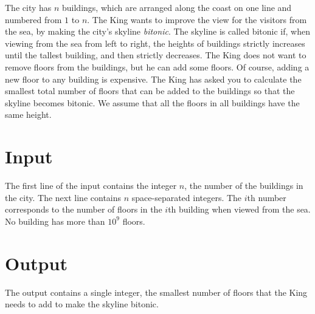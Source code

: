
The city has $n$ buildings, which are arranged along the coast on one line and numbered from $1$ to $n$.
The King wants to improve the view for the visitors from the sea, by making the city’s skyline \emph{bitonic}.
The skyline is called bitonic if, when viewing from the sea from left to right, the heights of buildings strictly increases until the tallest building, and then strictly decreases.
The King does not want to remove floors from the buildings, but he can add some floors.
Of course, adding a new floor to any building is expensive.
The King has asked you to calculate the smallest total number of floors that can be added to the buildings so that the skyline becomes bitonic.
We assume that all the floors in all buildings have the same height.

\section*{Input}
The first line of the input contains the integer $n$, the number of the buildings in the city.
The next line contains $n$ space-separated integers.
The $i$th number corresponds to the number of floors in the $i$th building when viewed from the sea.
No building has more than $10^9$ floors. 

\section*{Output}
The output contains a single integer, the smallest number of floors that the King needs to add to make the skyline bitonic.